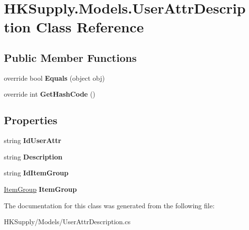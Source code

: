 \hypertarget{class_h_k_supply_1_1_models_1_1_user_attr_description}{}\section{H\+K\+Supply.\+Models.\+User\+Attr\+Description Class Reference}
\label{class_h_k_supply_1_1_models_1_1_user_attr_description}
\subsection*{Public Member Functions}
\begin{DoxyCompactItemize}
\item 
\mbox{\label{class_h_k_supply_1_1_models_1_1_user_attr_description_a8d736a9012d792b3f46527afef566265}} 
override bool {\bfseries Equals} (object obj)
\item 
\mbox{\label{class_h_k_supply_1_1_models_1_1_user_attr_description_a0f477183b38670114bc42adcd735a48f}} 
override int {\bfseries Get\+Hash\+Code} ()
\end{DoxyCompactItemize}
\subsection*{Properties}
\begin{DoxyCompactItemize}
\item 
\mbox{\label{class_h_k_supply_1_1_models_1_1_user_attr_description_a47be9c12a938bc6f19ded24c7727a0bf}} 
string {\bfseries Id\+User\+Attr}
\item 
\mbox{\label{class_h_k_supply_1_1_models_1_1_user_attr_description_a5a68e00f1f049bda9dcbcaa1be56b34e}} 
string {\bfseries Description}
\item 
\mbox{\label{class_h_k_supply_1_1_models_1_1_user_attr_description_a2e92ea55544984bbea92e10e76227ce0}} 
string {\bfseries Id\+Item\+Group}
\item 
\mbox{\label{class_h_k_supply_1_1_models_1_1_user_attr_description_accbb066e97340fdadaeb172a1c5d1e30}} 
\mbox{\hyperlink{class_h_k_supply_1_1_models_1_1_item_group}{Item\+Group}} {\bfseries Item\+Group}
\end{DoxyCompactItemize}


The documentation for this class was generated from the following file\+:\begin{DoxyCompactItemize}
\item 
H\+K\+Supply/\+Models/User\+Attr\+Description.\+cs\end{DoxyCompactItemize}
